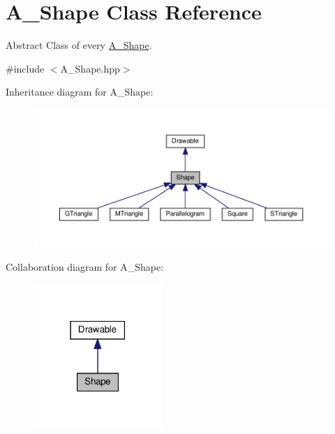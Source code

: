 \hypertarget{classShape}{}\section{A_Shape Class Reference}
\label{classShape}


Abstract Class of every \hyperlink{classShape}{A_Shape}.




{\ttfamily \#include $<$A_Shape.\+hpp$>$}



Inheritance diagram for A_Shape\+:\nopagebreak
\begin{figure}[H]
\begin{center}
\leavevmode
\includegraphics[width=350pt]{classShape__inherit__graph}
\end{center}
\end{figure}


Collaboration diagram for A_Shape\+:\nopagebreak
\begin{figure}[H]
\begin{center}
\leavevmode
\includegraphics[width=138pt]{classShape__coll__graph}
\end{center}
\end{figure}
